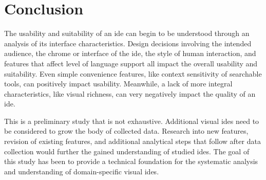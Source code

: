 \section{Conclusion}
\label{sec:conclusion}

The usability and suitability of an \ac{ide} can begin to be understood
through an analysis of its interface characteristics. Design decisions
involving the intended audience, the chrome or interface of the \ac{ide},
the style of human interaction, and features that affect level of language
support all impact the overall usability and suitability. Even simple
convenience features, like context sensitivity of searchable tools, can
positively impact usability. Meanwhile, a lack of more integral characteristics,
like visual richness, can very negatively impact the quality of an \ac{ide}.

This is a preliminary study that is not exhaustive. Additional visual \acp{ide} need to be
considered to grow the body of collected data. Research into new features,
revision of existing features, and additional analytical steps that follow after data
collection would further the gained understanding of studied \acp{ide}.
The goal of this study has been to provide a technical foundation for the
systematic analysis and understanding of domain-specific visual \acp{ide}.
